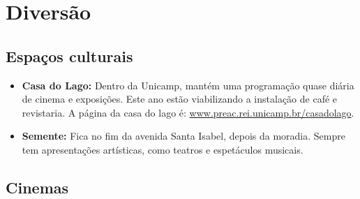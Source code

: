 
\section{Diversão}
\subsection{Espaços culturais}


\begin{itemize}
\item   \textbf{Casa do Lago:} Dentro da Unicamp, mantém uma programação quase
        diária de cinema e exposições. Este ano estão viabilizando a instalação
        de café e revistaria. A página da casa do lago é:
        \url{www.preac.rei.unicamp.br/casadolago}.

\item   \textbf{Semente:} Fica no fim da avenida Santa Isabel, depois da
        moradia. Sempre tem apresentações artísticas, como teatros e espetáculos
        musicais.
\end{itemize}

\subsection{Cinemas}

